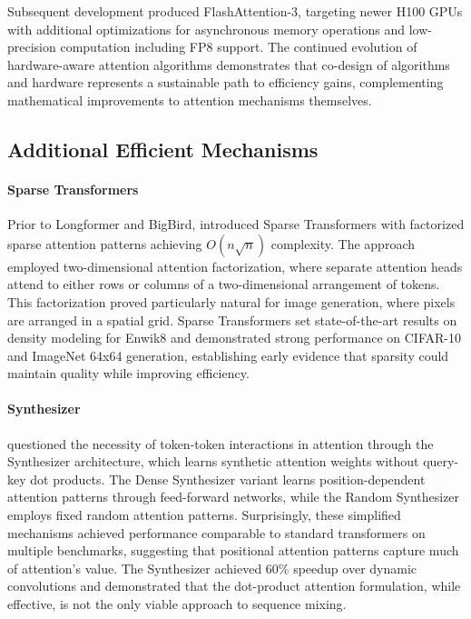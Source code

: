 Subsequent development produced FlashAttention-3, targeting newer H100 GPUs with additional optimizations for asynchronous memory operations and low-precision computation including FP8 support. The continued evolution of hardware-aware attention algorithms demonstrates that co-design of algorithms and hardware represents a sustainable path to efficiency gains, complementing mathematical improvements to attention mechanisms themselves.

\subsection{Additional Efficient Mechanisms}

\paragraph{Sparse Transformers}

Prior to Longformer and BigBird, \citet{child2019generating} introduced Sparse Transformers with factorized sparse attention patterns achieving $O(n\sqrt{n})$ complexity. The approach employed two-dimensional attention factorization, where separate attention heads attend to either rows or columns of a two-dimensional arrangement of tokens. This factorization proved particularly natural for image generation, where pixels are arranged in a spatial grid. Sparse Transformers set state-of-the-art results on density modeling for Enwik8 and demonstrated strong performance on CIFAR-10 and ImageNet 64x64 generation, establishing early evidence that sparsity could maintain quality while improving efficiency.

\paragraph{Synthesizer}

\citet{tay2020synthesizer} questioned the necessity of token-token interactions in attention through the Synthesizer architecture, which learns synthetic attention weights without query-key dot products. The Dense Synthesizer variant learns position-dependent attention patterns through feed-forward networks, while the Random Synthesizer employs fixed random attention patterns. Surprisingly, these simplified mechanisms achieved performance comparable to standard transformers on multiple benchmarks, suggesting that positional attention patterns capture much of attention's value. The Synthesizer achieved 60\% speedup over dynamic convolutions and demonstrated that the dot-product attention formulation, while effective, is not the only viable approach to sequence mixing.

